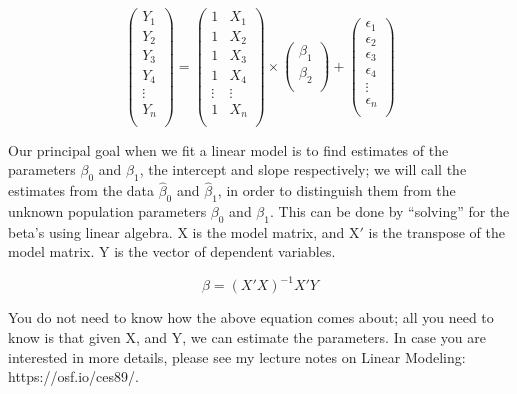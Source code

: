 \documentclass[12pt]{book}\usepackage[]{graphicx}\usepackage[]{color}
\begin{document}
\begin{equation} \label{matrixsum}
\left( \begin{array}{c}
Y_1 \\
Y_2 \\
Y_3 \\
Y_4 \\
\vdots \\
Y_n \\
\end{array} \right)
=
\left( \begin{array}{cc}
1 & X_1 \\
1 & X_2 \\
1 & X_3 \\
1 & X_4 \\
\vdots & \vdots \\
1 & X_n \\
\end{array} \right) 
\times 
\left( \begin{array}{c}
\beta_1 \\
\beta_2 \\
\end{array} \right)
+
\left( \begin{array}{c}
\epsilon_1 \\
\epsilon_2 \\
\epsilon_3 \\
\epsilon_4 \\
\vdots \\
\epsilon_n \\
\end{array} \right)
\end{equation}

Our principal goal when we fit a linear model is to find estimates of the parameters $\beta_0$ and $\beta_1$, the intercept and slope respectively; we will call the estimates from the data $\hat{\beta}_0$ and $\hat{\beta}_1$, in order to distinguish them from the unknown population parameters $\beta_0$ and $\beta_1$. This can be done by ``solving'' for the beta's using linear algebra. X is the model matrix, and X$'$ is the transpose of the model matrix. Y is the vector of dependent variables.

\begin{equation}
\beta=(X'X)^{-1} X'Y 
\end{equation}

You do not need to know how the above equation comes about; all you need to know is that given X, and Y, we can estimate the parameters.
In case you are interested in more details, please see my lecture notes on Linear Modeling: https://osf.io/ces89/.
\end{document}
